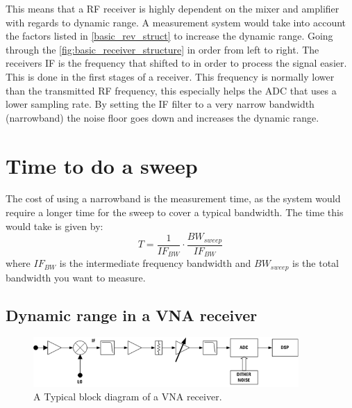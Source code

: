This means that a RF receiver is highly dependent on the mixer and amplifier with regards to dynamic range. A measurement system would take into account the factors listed in \autoref{basic_rev_struct} to increase the dynamic range. Going through the \autoref{fig:basic_receiver_structure} in order from left to right. The receivers \gls{IF} is the frequency that shifted to in order to process the signal easier.  This is done in the first stages of a receiver. This frequency is normally lower than the transmitted RF frequency, this especially helps the \gls{ADC} that uses a lower sampling rate. 
By setting the \gls{IF} filter to a very narrow bandwidth (narrowband) the noise floor goes down and increases the dynamic range. 

\section{Time to do a sweep}
The cost of using a narrowband is the measurement time, as the system would require a longer time for the sweep to cover a typical bandwidth. The time this would take is given by:
\begin{equation}
T = \frac{1}{IF_{BW}} \cdot \frac{BW_{sweep}}{IF_{BW}}
\end{equation}
where $IF_{BW}$ is the intermediate frequency bandwidth and $BW_{sweep}$ is the total bandwidth you want to measure.


\subsection{Dynamic range in a VNA receiver}
\begin{figure}[H]
\centering
\includegraphics[width=0.90\textwidth]{figures/Block_VNA.png}
\caption{A Typical block diagram of a VNA receiver.}
\label{Block_VNA}
\end{figure}

